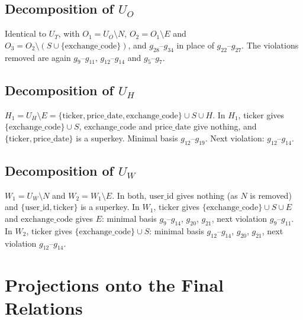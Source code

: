 \documentclass{article}
\newcommand{\at}[1]{\text{#1}}
\newcommand{\gr}[2]{g_{#1}\text{--}g_{#2}}
\begin{document}
\subsection{Decomposition of $U_O$}

Identical to $U_T$, with $O_1 = U_O \setminus N$, $O_2 = O_1 \setminus E$ and $O_3 = O_2 \setminus (S \cup \{\at{exchange\_code}\})$, and $\gr{28}{34}$ in place of $\gr{22}{27}$. The violations removed are again $\gr{9}{11}$, $\gr{12}{14}$ and $\gr{5}{7}$.

\subsection{Decomposition of $U_H$}

$H_1 = U_H \setminus E = \{\at{ticker}, \at{price\_date}, \at{exchange\_code}\} \cup S \cup H$. In $H_1$, $\at{ticker}$ gives $\{\at{exchange\_code}\} \cup S$, $\at{exchange\_code}$ and $\at{price\_date}$ give nothing, and $\{\at{ticker}, \at{price\_date}\}$ is a superkey. Minimal basis $\gr{12}{19}$. Next violation: $\gr{12}{14}$.

\subsection{Decomposition of $U_W$}

$W_1 = U_W \setminus N$ and $W_2 = W_1 \setminus E$. In both, $\at{user\_id}$ gives nothing (as $N$ is removed) and $\{\at{user\_id}, \at{ticker}\}$ is a superkey. In $W_1$, $\at{ticker}$ gives $\{\at{exchange\_code}\} \cup S \cup E$ and $\at{exchange\_code}$ gives $E$: minimal basis $\gr{9}{14}$, $g_{20}$, $g_{21}$, next violation $\gr{9}{11}$. In $W_2$, $\at{ticker}$ gives $\{\at{exchange\_code}\} \cup S$: minimal basis $\gr{12}{14}$, $g_{20}$, $g_{21}$, next violation $\gr{12}{14}$.

\section{Projections onto the Final Relations}
\end{document}
